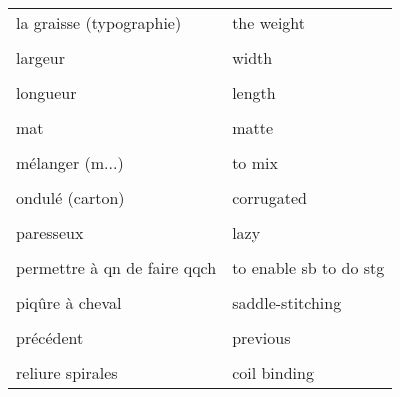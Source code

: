 \documentclass[
  10pt,
]{article}
\begin{document}
\begin{longtable}{ll}
la graisse (typographie) & the weight\\

\cellcolor{gray!6}{la rogne} & \cellcolor{gray!6}{cut-offs}\\

largeur & width\\

\cellcolor{gray!6}{le dos d'un livre} & \cellcolor{gray!6}{the spine}\\

longueur & length\\

\cellcolor{gray!6}{lycée} & \cellcolor{gray!6}{high-school}\\

mat & matte\\

\cellcolor{gray!6}{mélanger (b...)} & \cellcolor{gray!6}{to blend}\\

mélanger (m...) & to mix\\

\cellcolor{gray!6}{obsolète} & \cellcolor{gray!6}{outdated}\\

ondulé (carton) & corrugated\\

\cellcolor{gray!6}{ondulé} & \cellcolor{gray!6}{wavy}\\

paresseux & lazy\\

\cellcolor{gray!6}{pelliculage} & \cellcolor{gray!6}{lamination}\\

permettre à qn de faire qqch & to enable sb to do stg\\

\cellcolor{gray!6}{permettre à quelqu'un de faire qqch} & \cellcolor{gray!6}{to allow sb to do stg}\\

piqûre à cheval & saddle-stitching\\

\cellcolor{gray!6}{profondeur} & \cellcolor{gray!6}{depth}\\

précédent & previous\\

\cellcolor{gray!6}{relier un livre} & \cellcolor{gray!6}{to bind a book}\\

reliure spirales & coil binding\\


\end{longtable}
\end{document}
